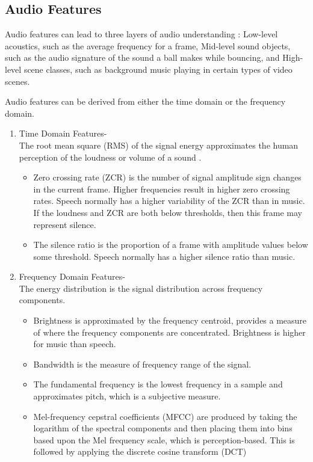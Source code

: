 \subsection{Audio Features}
Audio features can lead to three layers of audio understanding : Low-level acoustics, such as the average frequency for a frame, Mid-level sound objects, such as the audio signature of the sound a ball makes while bouncing, and High-level scene classes, such as background music playing in certain types of video scenes.

Audio features can be derived from either the time domain or the frequency domain. 
\begin{enumerate}
\item Time Domain Features-\\
The root mean square (RMS) of the signal energy approximates the human perception of
the loudness or volume of a sound .

\begin{itemize}
\item Zero crossing rate (ZCR) is the number of signal amplitude sign changes in the current frame. Higher frequencies result in higher zero crossing rates. Speech normally has a higher variability of the ZCR than in music. If the loudness and ZCR are both below thresholds, then this frame may represent silence.
\item The silence ratio is the proportion of a frame with amplitude values below some threshold. Speech normally has a higher silence ratio than music. 
\end{itemize}

\item Frequency Domain Features-\\
The energy distribution is the signal distribution across frequency components. 
\begin{itemize}
\item Brightness is approximated by the frequency centroid, provides a measure of where the frequency components are concentrated. Brightness is higher for music than speech.
\item Bandwidth is the measure of frequency range of the signal.
\item The fundamental frequency is the lowest frequency in a sample and approximates pitch, which is a subjective measure.
\item Mel-frequency cepstral coefficients (MFCC) are produced by taking the logarithm of the spectral components and then placing them into bins based upon the Mel frequency scale,
which is perception-based. This is followed by applying the discrete cosine transform (DCT)

\end{itemize}
\end{enumerate}


